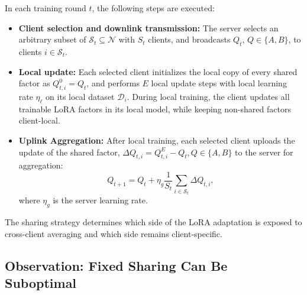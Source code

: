 \documentclass[lettersize,journal]{IEEEtran}
\begin{document}
	In each training round $t$, the following steps are executed:
	\begin{itemize}
		\item \textbf{Client selection and downlink transmission:}
		The server selects an arbitrary subset of $\mathcal{S}_t\subseteq\mathcal{N}$ with $S_t$ clients, and broadcasts $Q_t$, $Q \in \{A,B\}$, to clients $i\in\mathcal{S}_t$.
		
		\item \textbf{Local update:}
		Each selected client initializes the local copy of every shared factor as $Q_{t,i}^{0}=Q_t$, and performs $E$ local update steps with local learning rate $\eta_\ell$ on its local dataset $\mathcal{D}_i$. During local training, the client updates all trainable LoRA factors in its local model, while keeping non-shared factors client-local.
		
		\item \textbf{Uplink Aggregation:}
		After local training, each selected client uploads the update of the shared factor, $\Delta Q_{t,i} \!=\! Q_{t,i}^{E} \!-\! Q_t, Q\in \{A,B \}$ to the server for aggregation:
		\begin{equation}
			Q_{t+1}
			=
			Q_t
			+
			\eta_g
			\frac{1}{S_t}
			\sum_{i\in\mathcal{S}_t}
			\Delta Q_{t,i},
			\label{eq:generic_server_average_update}
		\end{equation}
		where $\eta_g$ is the server learning rate.
	\end{itemize}
	The sharing strategy determines which side of the LoRA adaptation is exposed to cross-client averaging and which side remains client-specific. 
	
	
	
	
	
	\subsection{Observation: Fixed Sharing Can Be Suboptimal}
	\label{subsec:motivation_study}
	
\end{document}
